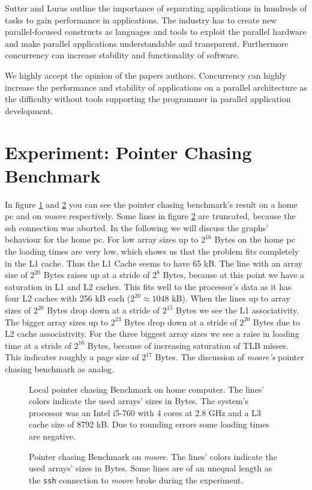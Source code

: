 \documentclass[DIV=12,oneside,a4paper]{scrartcl}
\begin{document}
Sutter and Luras outline the importance of separating applications in hundreds 
of tasks to gain performance in applications. The industry has to create new 
parallel-focused constructs as languages and tools to exploit the parallel 
hardware and make parallel applications understandable and transparent. 
Furthermore concurrency can increase stability and functionality of software.

We highly accept the opinion of the papers authors. Concurrency can highly 
increase the performance and stability of applications on a parallel architecture
as the difficulty without tools supporting the programmer in parallel application 
development.
      

\section{Experiment: Pointer Chasing Benchmark}
In figure \ref{pointer_chasing_local} and \ref{pointer_chasing_remote}
you can see the pointer chasing benchmark's result on a home pc and on \emph{moore}
respectively. Some lines in figure \ref{pointer_chasing_remote} are truncated, because
the ssh connection was aborted. In the following we will discuss the graphs' behaviour for
the home pc. For low array sizes up to $2^{16}$ Bytes on the home pc the loading times
are very low, which shows us that the problem fits completely in the L1 cache. Thus the
L1 Cache seems to have 65 kB. The line with an array size of $2^{20}$ Bytes raises
up at a stride of $2^8$ Bytes, because at this point we have a saturation in
L1 and L2 caches. This fits well to the processor's data as it has four
L2 caches with 256 kB each ($2^{20}\approx 1048$ kB). When the lines up to
array sizes of $2^20$ Bytes drop down at a stride of $2^15$ Bytes we see
the L1 associativity. The bigger array sizes up to $2^{23}$ Bytes drop
down at a stride of $2^{20}$ Bytes due to L2 cache associativity.
For the three biggest array sizes we see a raise in loading time at a stride of
$2^16$ Bytes, because of increasing saturation of TLB misses. This indicates roughly
a page size of $2^{17}$ Bytes. The discussion of \emph{moore's} pointer chasing benchmark
as analog.

\begin{figure}
	
	\label{pointer_chasing_local}
	\caption{Local pointer chasing Benchmark on home computer. The lines' colors indicate the
	         used arrays' sizes in Bytes. The system's processor was an Intel i5-760 with 
			 4 cores at 2.8 GHz and a L3 cache size of 8792 kB. Due to rounding errors
			 some loading times are negative.}
\end{figure}
\begin{figure}
	
	\label{pointer_chasing_remote}
	\caption{Pointer chasing Benchmark on \emph{moore}. The lines' colors indicate the
	         used arrays' sizes in Bytes. Some lines are of an unequal length as
			 the \texttt{ssh} connection to \emph{moore} broke during the experiment.} 
\end{figure}
\end{document}
